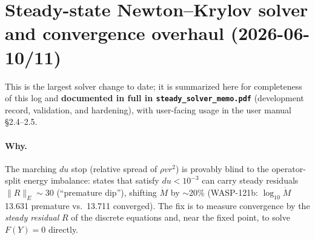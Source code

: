 \documentclass[english,a4paper]{kiseon_memo}
\begin{document}
\section{Steady-state Newton--Krylov solver and convergence overhaul
(2026-06-10/11)}\label{sec:jfnk}

This is the largest solver change to date; it is summarized here for
completeness of this log and \textbf{documented in full in
\texttt{steady\_solver\_memo.pdf}} (development record, validation, and
hardening), with user-facing usage in the user manual \S2.4--2.5.

\paragraph{Why.} The marching $du$ stop (relative spread of $\rho v r^2$)
is provably blind to the operator-split energy imbalance: states that
satisfy $du<10^{-3}$ can carry steady residuals $\|R\|_E\sim30$
(``premature dip''), shifting $\dot M$ by $\sim$20\% (WASP-121b:
$\log_{10}\dot M$ 13.631 premature vs.\ 13.711 converged). The fix is to
measure convergence by the \emph{steady residual} $R$ of the discrete
equations and, near the fixed point, to solve $F(Y)=0$ directly.
\end{document}
